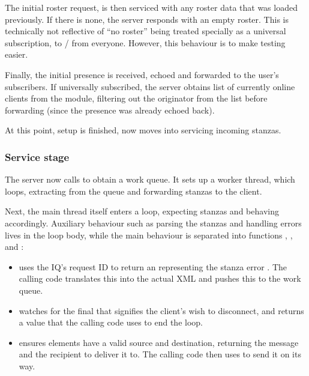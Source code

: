 \documentclass[12pt,a4paper,twoside,openright]{report}
\begin{document}
{The initial roster request, is then serviced with any roster data that was loaded previously. If there is none, the server responds with an empty roster. This is technically not reflective of ``no roster'' being treated specially as a universal subscription, to / from everyone. However, this behaviour is to make testing easier.

Finally, the initial presence is received, echoed and forwarded to the user's subscribers. If universally subscribed, the server obtains list of currently online clients from the  module, filtering out the originator from the list before forwarding (since the presence was already echoed back).

At this point, setup is finished, now moves into servicing incoming stanzas.

\subsubsection{Service stage}
The server now calls  to obtain a work queue. It sets up a worker thread, which loops, extracting from the queue and forwarding stanzas to the client.

Next, the main thread itself enters a loop, expecting stanzas and behaving accordingly. Auxiliary behaviour such as parsing the stanzas and handling errors lives in the loop body, while the main behaviour is separated into functions , , and :

\begin{itemize}
  \item {} uses the IQ's request ID to return an  representing the stanza error . The calling code translates this into the actual XML and pushes this to the work queue.

  \item {} watches for the final  that signifies the client's wish to disconnect, and returns a value that the calling code uses to end the loop.

  \item {} ensures  elements have a valid source and destination, returning the message and the recipient to deliver it to. The calling code then uses  to send it on its way.
\end{itemize}

}
\end{document}
